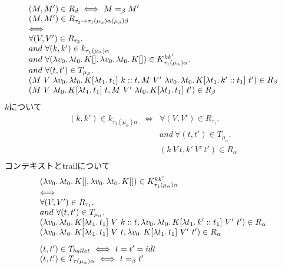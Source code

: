 \documentclass[japanese,draft]{jssst_ppl} %
\begin{document}
\[
\begin{array}{l}
  (M, M')\in R_d \ \Longleftrightarrow\ M =_{\beta}M'\\
  (M, M')\in R_{\tau_2 \rightarrow \tau_1 (\mu_{\alpha}) \alpha (\mu_{\beta})\beta}\\
  \Longleftrightarrow\\
  \forall (V, V')\in R_{\tau_2}.\\
  and\ \forall (k,k')\in k_{\tau_1(\mu_{\alpha})\alpha}\\
  and\ \forall (\Lam{v_0}{\Lam{t_0}{K[]}}, \Lam{v_0}{\Lam{t_0}{K[]}})\in  K^{kk'}_{\tau_1(\mu_{\alpha})\alpha}.\\
  and\  \forall (t, t')\in T_{\mu_{\beta}}.\\
  (M\ V \ \Lam{v_0}{\Lam{t_0}{K[\Lam{t_1}{t_1}]}}\ \Cons{k}{t}, M\ V' \ \Lam{v_0}{\Lam{t_0}{K[\Lam{t_1}{\Cons{k'}{t_1}}]}}\ t')\in R_{\beta}\\
  (M\ V \ \Lam{t_0}{K[\Lam{t_1}{t_1}]}\ t, M\ V' \ \Lam{t_0}{K[\Lam{t_1}{t_1}]}\ t')\in R_{\beta}\\
\end{array}
\]
$k$について\\
\[
\begin{array}{lcl}
  (k,k')\in k_{\tau_1(\mu_{\alpha})\alpha} &\Longleftrightarrow&
  \forall (V, V')\in R_{\tau_1}.\\
  & & and\ \forall (t, t')\in T_{\mu_{\alpha}}.\\
  & & (k\ V\ t, k'\ V'\ t')\in R_{\alpha}\\
\end{array}
\]
コンテキストとtrailについて
\[
\begin{array}{l}
  (\Lam{v_0}{\Lam{t_0}{K[]}}, \Lam{v_0}{\Lam{t_0}{K[]}}) \in K^{kk'}_{\tau_1(\mu_{\alpha})\alpha}\\
  \Longleftrightarrow\\
  \forall (V, V')\in R_{\tau_1}.\\
  and\ \forall (t, t')\in T_{\mu_{\alpha}}.\\
  (\Lam{v_0}{\Lam{t_0}{K[\Lam{t_1}{t_1}]}}\ V\ \Cons{k}{t}, \Lam{v_0}{\Lam{t_0}{K[\Lam{t_1}{\Cons{k'}{t_1}}]}}\ V'\ t')\in R_{\alpha}\\
  (\Lam{v_0}{\Lam{t_0}{K[\Lam{t_1}{t_1}]}}\ V\ t, \Lam{v_0}{K[\Lam{t_1}{t_1}]}\ V'\ t')\in R_{\alpha}\\
[3mm]
  (t, t')\in T_{bullet}\ \Longleftrightarrow\  t=t'=idt\\
  (t, t')\in T_{\tau(\mu_{\alpha})\alpha}\ \Longleftrightarrow\ t=_{\beta}t'\\
\end{array}
\]
\end{document}
